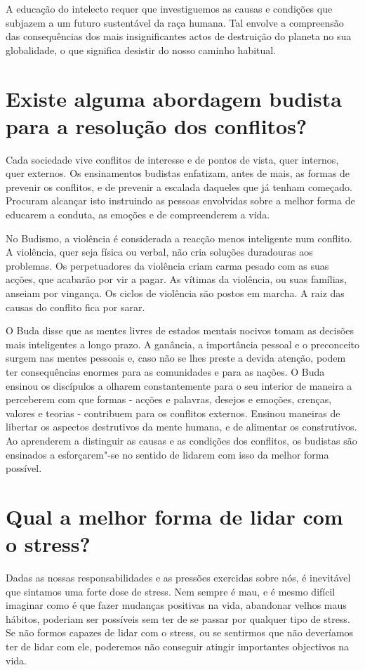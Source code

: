 A educação do intelecto requer que investiguemos as causas e condições
que subjazem a um futuro sustentável da raça humana. Tal envolve a
compreensão das consequências dos mais insignificantes actos de
destruição do planeta no sua globalidade, o que significa desistir do
nosso caminho habitual.

\section{Existe alguma abordagem budista para a resolução dos conflitos?}

Cada sociedade vive conflitos de interesse e de pontos de vista, quer
internos, quer externos. Os ensinamentos budistas enfatizam, antes de
mais, as formas de prevenir os conflitos, e de prevenir a escalada
daqueles que já tenham começado. Procuram alcançar isto instruindo as
pessoas envolvidas sobre a melhor forma de educarem a conduta, as
emoções e de compreenderem a vida.

No Budismo, a violência é considerada a reacção menos inteligente num
conflito. A violência, quer seja física ou verbal, não cria soluções
duradouras aos problemas. Os perpetuadores da violência criam carma
pesado com as suas acções, que acabarão por vir a pagar. As vítimas da
violência, ou suas famílias, anseiam por vingança. Os ciclos de
violência são postos em marcha. A raiz das causas do conflito fica por
sarar.

O Buda disse que as mentes livres de estados mentais nocivos tomam as
decisões mais inteligentes a longo prazo. A ganância, a importância
pessoal e o preconceito surgem nas mentes pessoais e, caso não se lhes
preste a devida atenção, podem ter consequências enormes para as
comunidades e para as nações. O Buda ensinou os discípulos a olharem
constantemente para o seu interior de maneira a perceberem com que
formas - acções e palavras, desejos e emoções, crenças, valores e
teorias - contribuem para os conflitos externos. Ensinou maneiras de
libertar os aspectos destrutivos da mente humana, e de alimentar os
construtivos. Ao aprenderem a distinguir as causas e as condições dos
conflitos, os budistas são ensinados a esforçarem"-se no sentido de
lidarem com isso da melhor forma possível.

\section{Qual a melhor forma de lidar com o stress?}

Dadas as nossas responsabilidades e as pressões exercidas sobre nós, é
inevitável que sintamos uma forte dose de stress. Nem sempre é mau, e é
mesmo difícil imaginar como é que fazer mudanças positivas na vida,
abandonar velhos maus hábitos, poderiam ser possíveis sem ter de se
passar por qualquer tipo de stress. Se não formos capazes de lidar com o
stress, ou se sentirmos que não deveríamos ter de lidar com ele,
poderemos não conseguir atingir importantes objectivos na vida.

